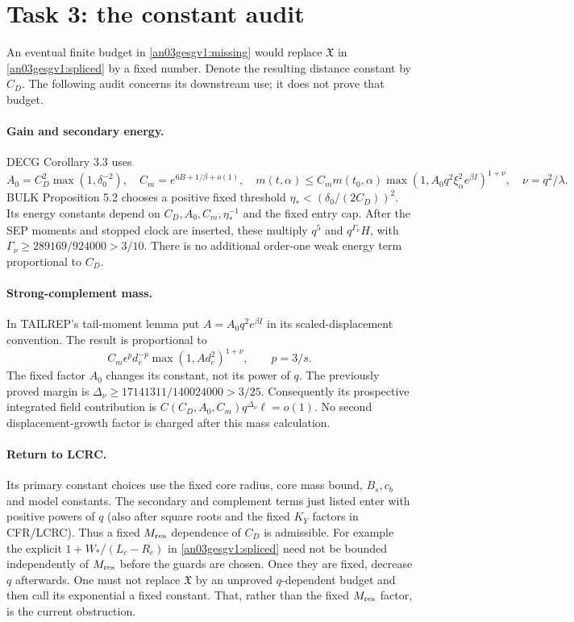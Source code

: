 \documentclass[11pt]{article}
\theoremstyle{remark}\newtheorem{remark}[proposition]{Remark}
\begin{document}
\section{Task 3: the constant audit}
An eventual finite budget in \eqref{an03gesgv1:missing} would
replace $\mathfrak X$ in \eqref{an03gesgv1:spliced} by a
fixed number. Denote the resulting distance constant by $C_D$.
The following audit concerns its downstream use; it does not
prove that budget.

\paragraph{Gain and secondary energy.}
DECG Corollary 3.3 uses
\[
 A_0=C_D^2\max(1,\delta_0^{-2}),\quad
 C_m=e^{6B+1/\beta+o(1)},\quad
 m(t,\alpha)\le C_m m(t_0,\alpha)
       \max(1,A_0q^2\xi_\alpha^2e^{\beta I})^{1+\nu},
 \quad \nu=q^2/\lambda.
\]
BULK Proposition 5.2 chooses a positive fixed threshold
$\eta_*<(\delta_0/(2C_D))^2$. Its energy constants depend
on $C_D,A_0,C_m,\eta_*^{-1}$ and the fixed entry cap. After
the SEP moments and stopped clock are inserted, these multiply
$q^5$ and $q^{\Gamma_\nu}H$, with
$\Gamma_\nu\ge289169/924000>3/10$.
There is no additional order-one weak energy term proportional
to $C_D$.

\paragraph{Strong-complement mass.}
In TAILREP's tail-moment lemma put
$A=A_0q^2e^{\beta I}$ in its scaled-displacement convention.
The result is proportional to
\[
 C_m\epsilon^p d_c^{-p}\max(1,A d_c^2)^{1+\nu},\qquad p=3/s.
\]
The fixed factor $A_0$ changes its constant, not its power of
$q$. The previously proved margin is
$\Delta_\nu\ge17141311/140024000>3/25$.
Consequently its prospective integrated field contribution is
$C(C_D,A_0,C_m)q^{\Delta_\nu}\ell=o(1)$.
No second displacement-growth factor is charged after this
mass calculation.

\paragraph{Return to LCRC.}
Its primary constant choices use the fixed core radius, core
mass bound, $B_s,c_b$ and model constants. The secondary and
complement terms just listed enter with positive powers of
$q$ (also after square roots and the fixed $K_Y$ factors in
CFR/LCRC). Thus a fixed $M_{\rm res}$ dependence of $C_D$
is admissible. For example the explicit
$1+W_*/(L_c-R_c)$ in \eqref{an03gesgv1:spliced} need not
be bounded independently of $M_{\rm res}$ before the guards
are chosen. Once they are fixed, decrease $q$ afterwards.
One must not replace $\mathfrak X$ by an unproved
$q$-dependent budget and then call its exponential a fixed
constant. That, rather than the fixed $M_{\rm res}$ factor,
is the current obstruction.
\end{document}
